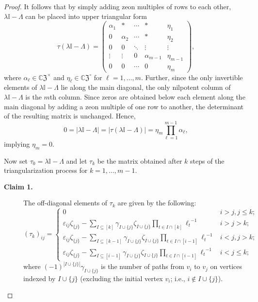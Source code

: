 \documentclass[10pt,a4paper]{amsart}
\newcommand{\CZ}{\mathbb{C}\mathfrak{Z}}
\newcommand{\mI}{\mathbb{I}}
\begin{document}
\begin{proof}
It follows that by simply adding zeon multiples of rows to each other, $\lambda\mI-\Lambda$ can be placed into upper triangular form  \begin{equation}\label{triangular form}
\tau(\lambda\mI-\Lambda)=\left(\begin{matrix}
\alpha_1&*&\cdots&*&\eta_1\\
0&\alpha_2&\cdots&*&\eta_2\\
0&0&\ddots&\vdots&\vdots\\
\vdots&\vdots&0&\alpha_{m-1}&\eta_{m-1}\\
0&0&\cdots&0&\eta_m
\end{matrix}\right),  
 \end{equation}
where $\alpha_\ell\in\CZ^\times$ and $\eta_\ell\in\CZ^\circ$ for $\ell=1, \ldots, m$.  Further, since the only invertible elements of $\lambda\mI-\Lambda$ lie along the main diagonal, the only nilpotent column of $\lambda\mI-\Lambda$ is the $m$th column.   Since zeros are obtained below each element along the main diagonal by adding a zeon multiple of one row to another, the determinant of the resulting matrix is unchanged.
Hence, 
\begin{equation*}
0=\vert \lambda\mI-\Lambda\vert=\vert \tau(\lambda\mI-\Lambda)\vert=\eta_m\prod_{\ell=1}^{m-1}\alpha_\ell,
\end{equation*}
implying $\eta_m=0$.


Now set $\tau_0=\lambda\mI-\Lambda$ and let $\tau_k$ be the matrix obtained after $k$ steps of the triangularization process for $k=1, \ldots, m-1$.  

\begin{description}
\item [{\bf Claim 1.}] The off-diagonal elements of $\tau_k$ are given by the following:
\begin{equation}\label{off-diag}
(\tau_k)_{ij}=\begin{cases}
0&  i>j, j\le k;\\
\varepsilon_{ij}\zeta_{\{j\}}-\sum_{I\subseteq [k]}\gamma_{I\cup\{j\}}\zeta_{I\cup\{j\}}\prod_{t\in I\cap[k]}{\ell_t}^{-1}& i > j > k;\\
\varepsilon_{ij}\zeta_{\{j\}}-\sum_{I\subseteq [k-1]}\gamma_{I\cup\{j\}}\zeta_{I\cup\{j\}}\prod_{t\in I\cap[i-1]}{\ell_t}^{-1}&  i< j, j>k;\\
\varepsilon_{ij}\zeta_{\{j\}}-\sum_{I\subseteq [i-1]}\gamma_{I\cup\{j\}}\zeta_{I\cup\{j\}}\prod_{t\in I\cap[i-1]}{\ell_t}^{-1} &i<j\le k;
\end{cases}
\end{equation}where $(-1)^{|I\cup\{j\}|}\gamma_{I\cup\{j\}}$ is the number of paths from $v_i$ to $v_j$ on vertices indexed by $I\cup\{j\}$ (excluding the initial vertex $v_i$; i.e.,  $i\notin I\cup\{j\}$).  
\end{description}


\end{proof}
\end{document}
